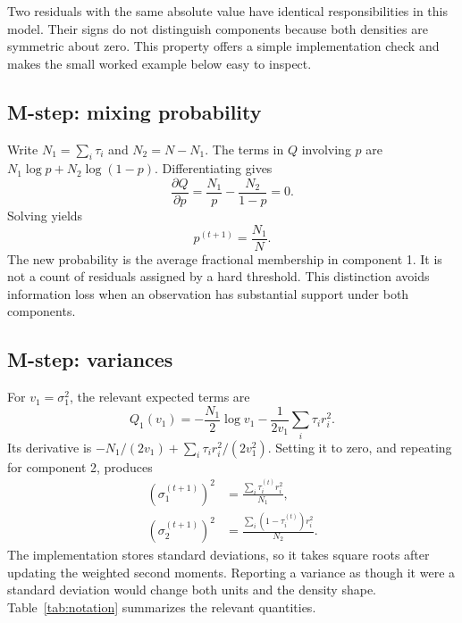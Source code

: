 \documentclass[conference,letterpaper]{IEEEtran}
\begin{document}
Two residuals with the same absolute value have identical responsibilities in this model. Their signs do not distinguish components because both densities are symmetric about zero. This property offers a simple implementation check and makes the small worked example below easy to inspect.

\subsection{M-step: mixing probability}
Write $N_1=\sum_i\tau_i$ and $N_2=N-N_1$. The terms in $Q$ involving $p$ are $N_1\log p+N_2\log(1-p)$. Differentiating gives
\begin{equation}
\frac{\partial Q}{\partial p}=\frac{N_1}{p}-\frac{N_2}{1-p}=0.
\end{equation}
Solving yields
\begin{equation}
p^{(t+1)}=\frac{N_1}{N}.
\label{eq:pupdate}
\end{equation}
The new probability is the average fractional membership in component 1. It is not a count of residuals assigned by a hard threshold. This distinction avoids information loss when an observation has substantial support under both components.

\subsection{M-step: variances}
For $v_1=\sigma_1^2$, the relevant expected terms are
\begin{equation}
Q_1(v_1)=-\frac{N_1}{2}\log v_1
-\frac{1}{2v_1}\sum_i\tau_i r_i^2.
\end{equation}
Its derivative is $-N_1/(2v_1)+\sum_i\tau_i r_i^2/(2v_1^2)$. Setting it to zero, and repeating for component 2, produces
\begin{align}
(\sigma_1^{(t+1)})^2&=\frac{\sum_i\tau_i^{(t)}r_i^2}{N_1},\\
(\sigma_2^{(t+1)})^2&=\frac{\sum_i(1-\tau_i^{(t)})r_i^2}{N_2}.
\label{eq:varianceupdate}
\end{align}
The implementation stores standard deviations, so it takes square roots after updating the weighted second moments. Reporting a variance as though it were a standard deviation would change both units and the density shape. Table~\ref{tab:notation} summarizes the relevant quantities.
\end{document}
